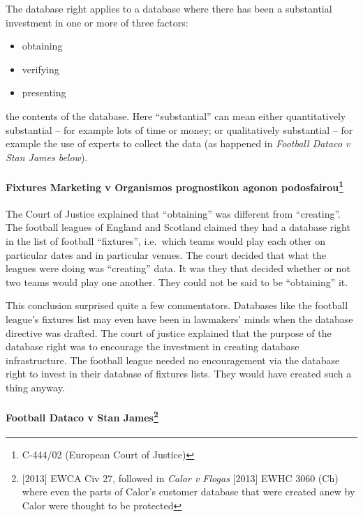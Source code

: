 The database right applies to a database where there has been a
substantial investment in one or more of three factors:

\begin{itemize}
\item
  obtaining
\item
  verifying
\item
  presenting
\end{itemize}

the contents of the database. Here ``substantial'' can mean either
quantitatively substantial -- for example lots of time or money; or
qualitatively substantial -- for example the use of experts to collect
the data (as happened in \emph{Football Dataco v Stan James below}).

\paragraph[Fixtures Marketing v Organismos prognostikon agonon
podosfairou]{Fixtures Marketing v Organismos prognostikon agonon
podosfairou\footnote{C-444/02 (European Court of Justice)}}\label{fixtures-marketing-v-organismos-prognostikon-agonon-podosfairou8}

The Court of Justice explained that ``obtaining'' was different from
``creating''. The football leagues of England and Scotland claimed they
had a database right in the list of football ``fixtures'', i.e.~which
teams would play each other on particular dates and in particular
venues. The court decided that what the leagues were doing was
``creating'' data. It was they that decided whether or not two teams
would play one another. They could not be said to be ``obtaining'' it.

This conclusion surprised quite a few commentators. Databases like the
football league's fixtures list may even have been in lawmakers' minds
when the database directive was drafted. The court of justice explained
that the purpose of the database right was to encourage the investment
in creating database infrastructure. The football league needed no
encouragement via the database right to invest in their database of
fixtures lists. They would have created such a thing anyway.

\paragraph[Football Dataco v Stan James]{Football Dataco v Stan
James\footnote{{[}2013{]} EWCA Civ 27, followed in \emph{Calor v Flogas}
  {[}2013{]} EWHC 3060 (Ch) where even the parts of Calor's customer
  database that were created anew by Calor were thought to be protected}}\label{football-dataco-v-stan-james9}

